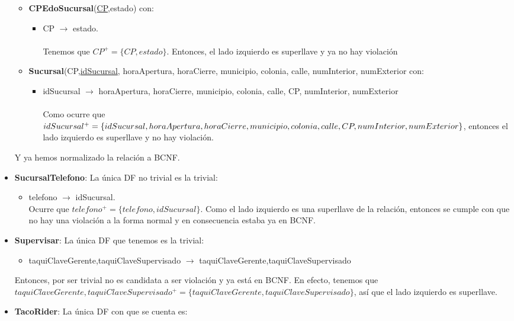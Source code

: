 \documentclass[11pt,letterpaper]{article}
\begin{document}
\begin{itemize}
\begin{itemize}
\item {\footnotesize \textbf{CPEdoSucursal}(\underline{CP},estado)} con:
\begin{itemize}
\item CP $\rightarrow$ estado.\\\\ Tenemos que $CP^+ = \{CP,estado\}$. Entonces, el lado izquierdo es superllave y ya no hay violación \checkmark
\end{itemize}
\item {\footnotesize \textbf{Sucursal}(CP,\underline{idSucursal}, horaApertura, horaCierre, municipio, colonia, calle, numInterior, numExterior} con:
\begin{itemize}
\item idSucursal $\rightarrow$ horaApertura, horaCierre, municipio, colonia, calle, CP, numInterior, numExterior\\\\Como ocurre que $idSucursal^+=\{idSucursal,horaApertura, horaCierre, municipio,\\ colonia, calle, CP, numInterior, numExterior\}$, entonces el lado izquierdo es superllave y no hay violación. \checkmark
\end{itemize}
\end{itemize}

Y ya hemos normalizado la relación a BCNF.

\item \textbf{SucursalTelefono}: La única DF no trivial es la trivial:

\begin{itemize}
\item telefono $\rightarrow$ idSucursal.\\Ocurre que $telefono^+=\{telefono,idSucursal\}$. Como el lado izquierdo es una superllave de la relación, entonces se cumple con que no hay una violación a la forma normal y en consecuencia estaba ya en BCNF. \checkmark
\end{itemize}
\item \textbf{Supervisar}: La única DF que tenemos es la trivial:

\begin{itemize}
\item taquiClaveGerente,taquiClaveSupervisado $\rightarrow$ taquiClaveGerente,taquiClaveSupervisado
\end{itemize}

Entonces, por ser trivial no es candidata a ser violación y ya está en BCNF. En efecto, tenemos que $taquiClaveGerente,taquiClaveSupervisado^+ = \{taquiClaveGerente,taquiClaveSupervisado\}$, así que el lado izquierdo es superllave. \checkmark
\item \textbf{TacoRider}: La única DF con que se cuenta es:


\end{itemize}
\end{document}
